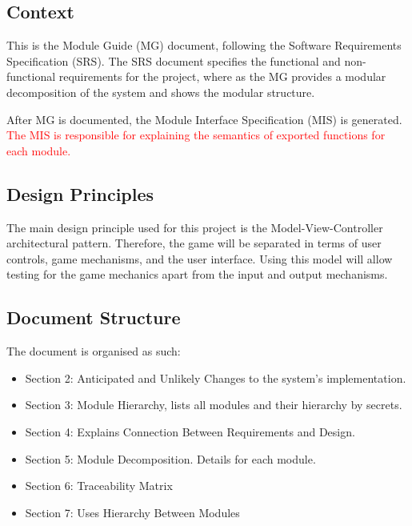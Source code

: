 \documentclass[12pt, titlepage]{article}
\begin{document}
\subsection{Context}
This is the Module Guide (MG) document, following the Software Requirements Specification (SRS). The SRS document specifies the functional and non-functional requirements for the project, where as the MG provides a modular decomposition of the system and shows the modular structure.

  After MG is documented, the Module Interface Specification (MIS) is generated. \textcolor{red}{The MIS is responsible for explaining the semantics of exported functions for each module.}

\subsection{Design Principles}

The main design principle used for this project is the Model-View-Controller architectural pattern. Therefore, the game will be separated in terms of user controls, game mechanisms, and the user interface. Using this model will allow testing for the game mechanics apart from the input and output mechanisms.

\subsection{Document Structure}

The document is organised as such:

\begin{itemize}

\item Section 2: Anticipated and Unlikely Changes to the system's implementation.

\item Section 3: Module Hierarchy, lists all modules and their hierarchy by secrets.

\item Section 4: Explains Connection Between Requirements and Design.

\item Section 5: Module Decomposition. Details for each module.

\item Section 6: Traceability Matrix

\item Section 7: Uses Hierarchy Between Modules

\end{itemize}
\end{document}
